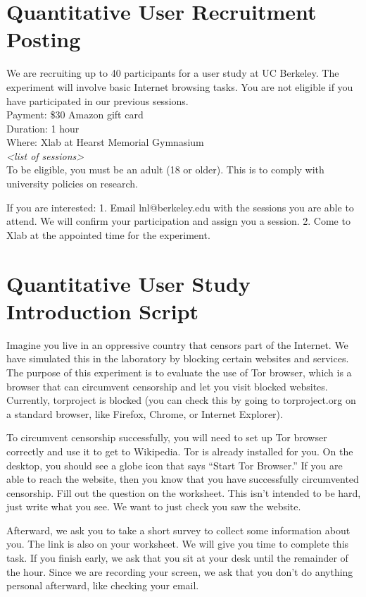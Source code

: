 \documentclass[USenglish,oneside,twocolumn]{article}
\begin{document}
\section{Quantitative User Recruitment Posting}
\label{quantitative-recruitment}
We are recruiting up to 40 participants for a user study at UC Berkeley. The experiment will involve basic Internet browsing tasks. You are not eligible if you have participated in our previous sessions.\\

\indent Payment: \$30 Amazon gift card\\
\indent Duration: 1 hour \\
\indent Where: Xlab at Hearst Memorial Gymnasium\\

\textit{<list of sessions>}\\

To be eligible, you must be an adult (18 or older). This is to comply with university policies on research. 

If you are interested: 1. Email lnl@berkeley.edu with the sessions you are able to attend. We will confirm your participation and assign you a session. 2. Come to Xlab at the appointed time for the experiment.

\section{Quantitative User Study Introduction Script} 
\label{quantitative-script} 
Imagine you live in an oppressive country that censors part of the Internet. We have simulated this in the laboratory by blocking certain websites and services.  The purpose of this experiment is to evaluate the use of Tor browser, which is a browser that can circumvent censorship and let you visit blocked websites. Currently, torproject is blocked (you can check this by going to torproject.org on a standard browser, like Firefox, Chrome, or Internet Explorer). 

To circumvent censorship successfully, you will need to set up Tor browser correctly and use it to get to Wikipedia. Tor is already installed for you. On the desktop, you should see a globe icon that says ``Start Tor Browser.'' If you are able to reach the website, then you know that you have successfully circumvented censorship. Fill out the question on the worksheet. This isn't intended to be hard, just write what you see. We want to just check you saw the website. 

Afterward, we ask you to take a short survey to collect some information about you. The link is also on your worksheet.
We will give you time to complete this task. If you finish early, we ask that you sit at your desk until the remainder of the hour. Since we are recording your screen, we ask that you don't do anything personal afterward, like checking your email.
\end{document}
